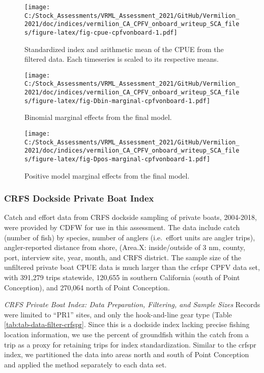 \documentclass[11pt,
  english,
  a4paper,
]{article}
\begin{document}
\begin{figure}
\centering
\texttt{[image: C:/Stock\_Assessments/VRML\_Assessment\_2021/GitHub/Vermilion\_2021/doc/indices/vermilion\_CA\_CPFV\_onboard\_writeup\_SCA\_files/figure-latex/fig-cpue-cpfvonboard-1.pdf]}
\caption{\label{fig:fig-cpue-cpfvonboard}Standardized index and arithmetic mean of the CPUE from the filtered data. Each timeseries is scaled to its respective means.}
\end{figure}

\begin{figure}
\centering
\texttt{[image: C:/Stock\_Assessments/VRML\_Assessment\_2021/GitHub/Vermilion\_2021/doc/indices/vermilion\_CA\_CPFV\_onboard\_writeup\_SCA\_files/figure-latex/fig-Dbin-marginal-cpfvonboard-1.pdf]}
\caption{\label{fig:fig-Dbin-marginal-cpfvonboard}Binomial marginal effects from the final model.}
\end{figure}

\begin{figure}
\centering
\texttt{[image: C:/Stock\_Assessments/VRML\_Assessment\_2021/GitHub/Vermilion\_2021/doc/indices/vermilion\_CA\_CPFV\_onboard\_writeup\_SCA\_files/figure-latex/fig-Dpos-marginal-cpfvonboard-1.pdf]}
\caption{\label{fig:fig-Dpos-marginal-cpfvonboard}Positive model marginal effects from the final model.}
\end{figure}


\hypertarget{crfs-dockside-private-boat-index}{%
\subsubsection{CRFS Dockside Private Boat Index}\label{crfs-dockside-private-boat-index}}

\leavevmode\tagmcend\tagstructend

Catch and effort data from CRFS dockside sampling of private boats, 2004-2018, were provided by CDFW for use in this assessment. The data include catch (number of fish) by species, number of anglers (i.e.~effort units are angler trips), angler-reported distance from shore, (Area.X: inside/outside of 3 nm, county, port, interview site, year, month, and CRFS district. The sample size of the unfiltered private boat CPUE data is much larger than the crfspr CPFV data set, with 391,279 trips statewide, 120,655 in southern California (south of Point Conception), and 270,064 north of Point Conception.

\emph{CRFS Private Boat Index: Data Preparation, Filtering, and Sample Sizes} Records were limited to ``PR1'' sites, and only the hook-and-line gear type (Table \ref{tab:tab-data-filter-crfspr}. Since this is a dockside index lacking precise fishing location information, we use the percent of groundfish within the catch from a trip as a proxy for retaining trips for index standardization. Similar to the crfspr index, we partitioned the data into areas north and south of Point Conception and applied the method separately to each data set.
\end{document}

